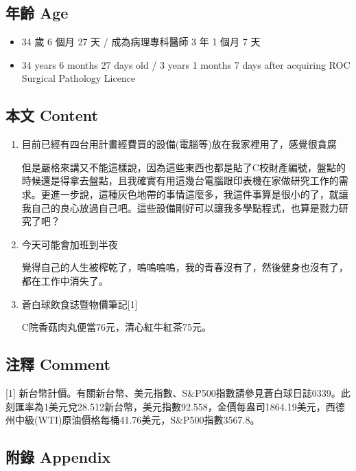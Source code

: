 \documentclass[
]{article}
\providecommand{\tightlist}{%
  \setlength{\itemsep}{0pt}\setlength{\parskip}{0pt}}
\begin{document}
\hypertarget{ux5e74ux9f61-age-14}{%
\subsection{年齡 Age}\label{ux5e74ux9f61-age-14}}

\begin{itemize}
\tightlist
\item
  34 歲 6 個月 27 天 / 成為病理專科醫師 3 年 1 個月 7 天
\item
  34 years 6 months 27 days old / 3 years 1 months 7 days after
  acquiring ROC Surgical Pathology Licence
\end{itemize}

\hypertarget{ux672cux6587-content-14}{%
\subsection{本文 Content}\label{ux672cux6587-content-14}}

\begin{enumerate}
\def\labelenumi{\arabic{enumi}.}
\item
  目前已經有四台用計畫經費買的設備(電腦等)放在我家裡用了，感覺很貪腐

  但是嚴格來講又不能這樣說，因為這些東西也都是貼了C校財產編號，盤點的時候還是得拿去盤點，且我確實有用這幾台電腦跟印表機在家做研究工作的需求。更進一步說，這種灰色地帶的事情這麼多，我這件事算是很小的了，就讓我自己的良心放過自己吧。這些設備剛好可以讓我多學點程式，也算是戮力研究了吧？
\item
  今天可能會加班到半夜

  覺得自己的人生被榨乾了，嗚嗚嗚嗚，我的青春沒有了，然後健身也沒有了，都在工作中消失了。
\item
  蒼白球飲食誌暨物價筆記{[}1{]}

  C院香菇肉丸便當76元，清心紅牛紅茶75元。
\end{enumerate}

\hypertarget{ux6ce8ux91cb-comment-14}{%
\subsection{注釋 Comment}\label{ux6ce8ux91cb-comment-14}}

{[}1{]}
新台幣計價。有關新台幣、美元指數、S\&P500指數請參見蒼白球日誌0339。此刻匯率為1美元兌28.512新台幣，美元指數92.558，金價每盎司1864.19美元，西德州中級(WTI)原油價格每桶41.76美元，S\&P500指數3567.8。

\hypertarget{ux9644ux9304-appendix-14}{%
\subsection{附錄 Appendix}\label{ux9644ux9304-appendix-14}}
\end{document}
